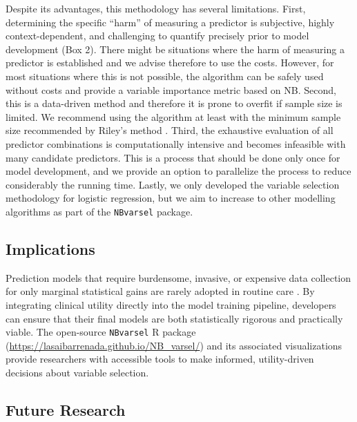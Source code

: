 Despite its advantages, this methodology has several limitations. First, determining the specific \enquote{harm} of measuring a predictor is subjective, highly context-dependent, and challenging to quantify precisely prior to model development (Box 2). There might be situations where the harm of measuring a predictor is established and we advise therefore to use the costs. However, for most situations where this is not possible, the algorithm can be safely used without costs and provide a variable importance metric based on \gls{NB}. Second, this is a data-driven method and therefore it is prone to overfit if sample size is limited. We recommend using the algorithm at least with the minimum sample size recommended by Riley's method \cite{rileyMinimumSampleSize2021}. Third, the exhaustive evaluation of all predictor combinations is computationally intensive and becomes infeasible with many candidate predictors. This is a process that should be done only once for model development, and we provide an option to parallelize the process to reduce considerably the running time. Lastly, we only developed the variable selection methodology for logistic regression, but we aim to increase to other modelling algorithms as part of the \texttt{NBvarsel} package.

\subsection{Implications}

Prediction models that require burdensome, invasive, or expensive data collection for only marginal statistical gains are rarely adopted in routine care \cite{wyattCommentaryPrognosticModels1995}. By integrating clinical utility directly into the model training pipeline, developers can ensure that their final models are both statistically rigorous and practically viable. The open-source \texttt{NBvarsel} R package (\url{https://lasaibarrenada.github.io/NB_varsel/}) and its associated visualizations provide researchers with accessible tools to make informed, utility-driven decisions about variable selection.

\subsection{Future Research}

